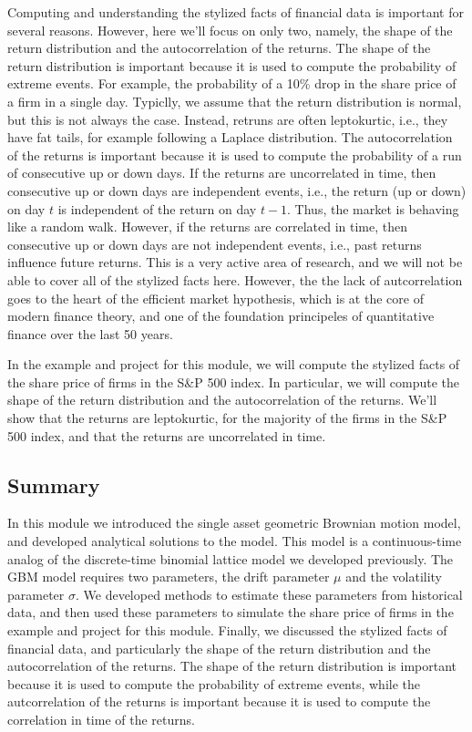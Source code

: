\documentclass[11pt]{article}
\theoremstyle{definition}
\begin{document}
Computing and understanding the stylized facts of financial data is important for several reasons. 
However, here we'll focus on only two, namely, the shape of the return distribution and the autocorrelation of the returns.
The shape of the return distribution is important because it is used to compute the probability of extreme events.
For example, the probability of a 10\% drop in the share price of a firm in a single day. 
Typiclly, we assume that the return distribution is normal, but this is not always the case. 
Instead, retruns are often leptokurtic, i.e., they have fat tails, for example following a Laplace distribution.
The autocorrelation of the returns is important because it is used to compute the probability of a run of consecutive up or down days.
If the returns are uncorrelated in time, then consecutive up or down days are independent events, i.e., 
the return (up or down) on day $t$ is independent of the return on day $t-1$. Thus, the market is behaving like a random walk.
However, if the returns are correlated in time, then consecutive up or down days are not independent events, i.e., 
past returns influence future returns. This is a very active area of research, and we will not be able to cover all of the stylized facts here. However, the 
the lack of autcorrelation goes to the heart of the efficient market hypothesis, which is at the core of modern finance theory, 
and one of the foundation principeles of quantitative finance over the last 50 years.

In the example and project for this module, we will compute the stylized facts of the share price of firms in the S\&P 500 index.
In particular, we will compute the shape of the return distribution and the autocorrelation of the returns. 
We'll show that the returns are leptokurtic, for the majority of the firms in the S\&P 500 index, and that the returns are uncorrelated in time.

\subsection{Summary}
In this module we introduced the single asset geometric Brownian motion model, and developed analytical solutions to the model.
This model is a continuous-time analog of the discrete-time binomial lattice model we developed previously.
The GBM model requires two parameters, the drift parameter $\mu$ and the volatility parameter $\sigma$. 
We developed methods to estimate these parameters from historical data, 
and then used these parameters to simulate the share price of firms in the example and project for this module.
Finally, we discussed the stylized facts of financial data, and particularly the shape of the return distribution and the autocorrelation of the returns.
The shape of the return distribution is important because it is used to compute the probability of extreme events, 
while the autcorrelation of the returns is important because it is used to compute the correlation in time of the returns. 
\end{document}
